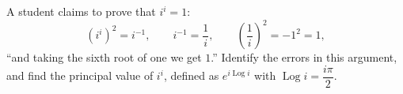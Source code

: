 A student claims to prove that $i^i=1$:
\[\left(i^i\right)^2=i^{-1},\qquad i^{-1}=\dfrac1i,\qquad\left(\dfrac1i\right)^2=-1^2=1,\]
``and taking the sixth root of one we get $1$.'' Identify the errors in this argument, and find the principal value of $i^i$, defined as $e^{i\operatorname{Log}i}$ with $\operatorname{Log}i=\dfrac{i\pi}{2}$.
